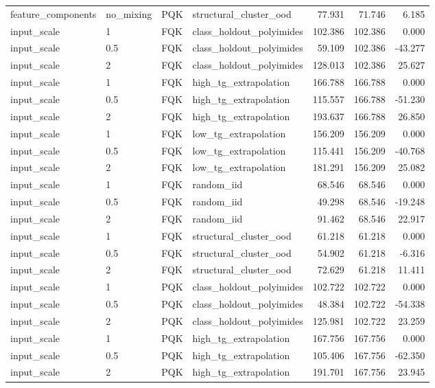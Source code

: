 \begin{tabular}{llllrrr}
feature\_components & no\_mixing & PQK & structural\_cluster\_ood & 77.931 & 71.746 & 6.185 \\
input\_scale & 1 & FQK & class\_holdout\_polyimides & 102.386 & 102.386 & 0.000 \\
input\_scale & 0.5 & FQK & class\_holdout\_polyimides & 59.109 & 102.386 & -43.277 \\
input\_scale & 2 & FQK & class\_holdout\_polyimides & 128.013 & 102.386 & 25.627 \\
input\_scale & 1 & FQK & high\_tg\_extrapolation & 166.788 & 166.788 & 0.000 \\
input\_scale & 0.5 & FQK & high\_tg\_extrapolation & 115.557 & 166.788 & -51.230 \\
input\_scale & 2 & FQK & high\_tg\_extrapolation & 193.637 & 166.788 & 26.850 \\
input\_scale & 1 & FQK & low\_tg\_extrapolation & 156.209 & 156.209 & 0.000 \\
input\_scale & 0.5 & FQK & low\_tg\_extrapolation & 115.441 & 156.209 & -40.768 \\
input\_scale & 2 & FQK & low\_tg\_extrapolation & 181.291 & 156.209 & 25.082 \\
input\_scale & 1 & FQK & random\_iid & 68.546 & 68.546 & 0.000 \\
input\_scale & 0.5 & FQK & random\_iid & 49.298 & 68.546 & -19.248 \\
input\_scale & 2 & FQK & random\_iid & 91.462 & 68.546 & 22.917 \\
input\_scale & 1 & FQK & structural\_cluster\_ood & 61.218 & 61.218 & 0.000 \\
input\_scale & 0.5 & FQK & structural\_cluster\_ood & 54.902 & 61.218 & -6.316 \\
input\_scale & 2 & FQK & structural\_cluster\_ood & 72.629 & 61.218 & 11.411 \\
input\_scale & 1 & PQK & class\_holdout\_polyimides & 102.722 & 102.722 & 0.000 \\
input\_scale & 0.5 & PQK & class\_holdout\_polyimides & 48.384 & 102.722 & -54.338 \\
input\_scale & 2 & PQK & class\_holdout\_polyimides & 125.981 & 102.722 & 23.259 \\
input\_scale & 1 & PQK & high\_tg\_extrapolation & 167.756 & 167.756 & 0.000 \\
input\_scale & 0.5 & PQK & high\_tg\_extrapolation & 105.406 & 167.756 & -62.350 \\
input\_scale & 2 & PQK & high\_tg\_extrapolation & 191.701 & 167.756 & 23.945 \\

\end{tabular}

